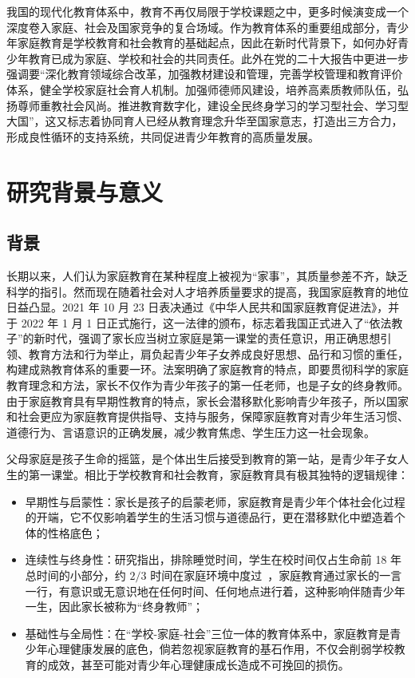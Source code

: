 \documentclass[zihao = -4, linespread = 1.5]{article}
\begin{document}
我国的现代化教育体系中，教育不再仅局限于学校课题之中，更多时候演变成一个深度卷入家庭、社会及国家竞争的复合场域。作为教育体系的重要组成部分，青少年家庭教育是学校教育和社会教育的基础起点，因此在新时代背景下，如何办好青少年教育已成为家庭、学校和社会的共同责任。此外在党的二十大报告中更进一步强调要“深化教育领域综合改革，加强教材建设和管理，完善学校管理和教育评价体系，健全学校家庭社会育人机制。加强师德师风建设，培养高素质教师队伍，弘扬尊师重教社会风尚。推进教育数字化，建设全民终身学习的学习型社会、学习型大国”，这又标志着协同育人已经从教育理念升华至国家意志，打造出三方合力，形成良性循环的支持系统，共同促进青少年教育的高质量发展。



\section{研究背景与意义}
\subsection{背景}
长期以来，人们认为家庭教育在某种程度上被视为“家事”，其质量参差不齐，缺乏科学的指引。然而现在随着社会对人才培养质量要求的提高，我国家庭教育的地位日益凸显。2021 年 10 月 23 日表决通过《中华人民共和国家庭教育促进法》，并于 2022 年 1 月 1 日正式施行，这一法律的颁布，标志着我国正式进入了“依法教子”的新时代，强调了家长应当树立家庭是第一课堂的责任意识，用正确思想引领、教育方法和行为举止，肩负起青少年子女养成良好思想、品行和习惯的重任，构建成熟教育体系的重要一环。法案明确了家庭教育的特点，即要贯彻科学的家庭教育理念和方法，家长不仅作为青少年孩子的第一任老师，也是子女的终身教师。由于家庭教育具有早期性教育的特点，家长会潜移默化影响青少年孩子，所以国家和社会更应为家庭教育提供指导、支持与服务，保障家庭教育对青少年生活习惯、道德行为、言语意识的正确发展，减少教育焦虑、学生压力这一社会现象。

父母家庭是孩子生命的摇篮，是个体出生后接受到教育的第一站，是青少年子女人生的第一课堂。相比于学校教育和社会教育，家庭教育具有极其独特的逻辑规律：

\begin{itemize}
    \item 早期性与启蒙性：家长是孩子的启蒙老师，家庭教育是青少年个体社会化过程的开端，它不仅影响着学生的生活习惯与道德品行，更在潜移默化中塑造着个体的性格底色；
    \item 连续性与终身性：研究指出，排除睡觉时间，学生在校时间仅占生命前 18 年总时间的小部分，约 $2/3$ 时间在家庭环境中度过~\citep{Walberg}，家庭教育通过家长的一言一行，有意识或无意识地在任何时间、任何地点进行着，这种影响伴随青少年一生，因此家长被称为“终身教师”；
    \item 基础性与全局性：在“学校-家庭-社会”三位一体的教育体系中，家庭教育是青少年心理健康发展的底色，倘若忽视家庭教育的基石作用，不仅会削弱学校教育的成效，甚至可能对青少年心理健康成长造成不可挽回的损伤。
\end{itemize}
\end{document}
